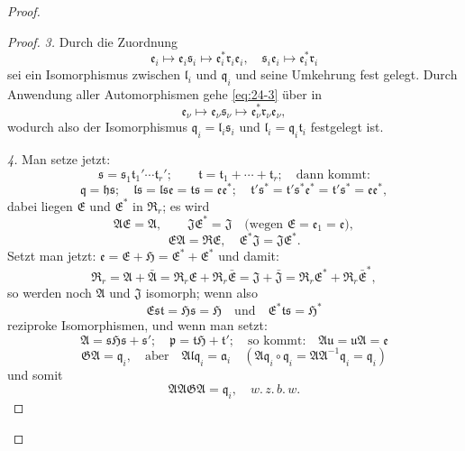 \documentclass[12pt,a4paper]{article}
\theoremstyle{plain}
\theoremstyle{definition}
\theoremstyle{remark}
\newcommand{\wzbw}{w.\,z.\,b.\,w.}
\begin{document}
\begin{proof}
\begin{proof}
\textit{3.} Durch die Zuordnung
\begin{equation}\label{eq:24-3}
\mathfrak{e}_{i} \mapsto \mathfrak{e}_{i}\mathfrak{s}_{i} \mapsto \mathfrak{e}_{i}^{*}\mathfrak{r}_{i}\mathfrak{e}_{i}, \quad
\mathfrak{s}_{i}\mathfrak{e}_{i} \mapsto \mathfrak{e}_{i}^{*}\mathfrak{r}_{i}
\end{equation}
sei ein Isomorphismus zwischen $\mathfrak{l}_{i}$ und $\mathfrak{q}_{i}$ und seine Umkehrung fest
gelegt. Durch Anwendung aller Automorphismen gehe \eqref{eq:24-3} \"uber in
\[
\mathfrak{e}_{\nu} \mapsto \mathfrak{e}_{\nu}\mathfrak{s}_{\nu} \mapsto \mathfrak{e}_{\nu}^{*}\mathfrak{r}_{\nu}\mathfrak{e}_{\nu},
\]
wodurch also der Isomorphismus $\mathfrak{q}_{i} = \mathfrak{l}_{i}\mathfrak{s}_{i}$ und $\mathfrak{l}_{i} = \mathfrak{q}_{i}\mathfrak{t}_{i}$ festgelegt ist.

\textit{4.} Man setze jetzt:
\[
\mathfrak{s} = \mathfrak{s}_{1}\mathfrak{t}_{1}'\cdots\mathfrak{t}_{r}';
\qquad
\mathfrak{t} = \mathfrak{t}_{1} + \cdots + \mathfrak{t}_{r}; \quad \text{dann kommt:}
\]
\[
\mathfrak{q} = \mathfrak{h}\mathfrak{s}; \quad \mathfrak{l}\mathfrak{s} = \mathfrak{l}\mathfrak{s}\mathfrak{e} = \mathfrak{t}\mathfrak{s} = \mathfrak{e}\mathfrak{e}^{*};
\quad
\mathfrak{t}'\mathfrak{s}^{*} = \mathfrak{t}'\mathfrak{s}^{*}\mathfrak{e}^{*} = \mathfrak{t}'\mathfrak{s}^{*} = \mathfrak{e}\mathfrak{e}^{*},
\]
dabei liegen $\mathfrak{E}$ und $\mathfrak{E}^{*}$ in $\mathfrak{R}_{r}$; es wird
\[
\mathfrak{A}\mathfrak{E} = \mathfrak{A}, \qquad \mathfrak{J}\mathfrak{E}^{*} = \mathfrak{J} \quad \text{(wegen } \mathfrak{E} = \mathfrak{e}_{1} = \mathfrak{e}),
\]
\[
\mathfrak{E}\mathfrak{A} = \mathfrak{R}\mathfrak{E}, \quad \mathfrak{E}^{*}\mathfrak{J} = \mathfrak{J}\mathfrak{E}^{*}.
\]
Setzt man jetzt: $\mathfrak{e} = \mathfrak{E} + \mathfrak{H} = \mathfrak{E}^{*} + \mathfrak{E}^{*}$ und damit:
\[
\mathfrak{R}_{r} = \mathfrak{A} + \bar{\mathfrak{A}} = \mathfrak{R}_{r}\mathfrak{E} + \mathfrak{R}_{r}\bar{\mathfrak{E}}
= \mathfrak{J} + \bar{\mathfrak{J}} = \mathfrak{R}_{r}\mathfrak{E}^{*} + \mathfrak{R}_{r}\bar{\mathfrak{E}}^{*},
\]
so werden noch $\mathfrak{A}$ und $\mathfrak{J}$ isomorph; wenn also
\[
\mathfrak{E}\mathfrak{s}\mathfrak{t} = \mathfrak{H}\mathfrak{s} = \mathfrak{H} \quad \text{und} \quad
\mathfrak{E}^{*}\mathfrak{t}\mathfrak{s} = \mathfrak{H}^{*}
\]
reziproke Isomorphismen, und wenn man setzt:
\[
\mathfrak{A} = \mathfrak{s}\mathfrak{H}\mathfrak{s} + \mathfrak{s}'; \quad
\mathfrak{p} = \mathfrak{t}\mathfrak{H} + \mathfrak{t}'; \quad \text{so kommt:}\quad
\mathfrak{A}\mathfrak{u} = \mathfrak{u}\mathfrak{A} = \mathfrak{e}
\]
\[
\mathfrak{G}\mathfrak{A} = \mathfrak{q}_{i}, \quad \text{aber} \quad
\mathfrak{A}\mathfrak{l}\mathfrak{q}_{i} = \mathfrak{a}_{i} \quad
(\mathfrak{A}\mathfrak{q}_{i} \circ \mathfrak{q}_{i} = \mathfrak{A}\mathfrak{A}^{-1}\mathfrak{q}_{i} = \mathfrak{q}_{i})
\]
und somit
\[
\mathfrak{A}\mathfrak{A}\mathfrak{G}\mathfrak{A} = \mathfrak{q}_{i}, \quad \wzbw
\]
\qedhere
\end{proof}


\end{proof}
\end{document}

